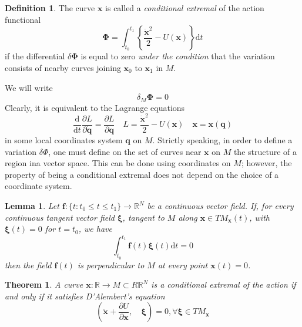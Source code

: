 \documentclass[conference]{IEEEtran}
\newtheorem{theorem}{Theorem}[section]
\newtheorem{lemma}{Lemma}[section]
\theoremstyle{definition}
\newtheorem{definition}{Definition}[section]
\theoremstyle{remark}
\begin{document}
    \begin{definition}
        The curve $\mathbf{x}$ is called a \emph{conditional extremal} of the action functional
        \begin{equation*}
            \bm{\Phi} = \int_{t_0}^{t_1} \left\{ \dfrac{\dot{\mathbf{x}}^2}{2} - U(\mathbf{x}) \right\} \mathrm{d} t
        \end{equation*}
        if the differential $\delta \bm{\Phi}$ is equal to zero \emph{under the condition} that the variation consists of nearby curves joining $\mathbf{x}_0$ to $\mathbf{x}_1$ in $M$.
    \end{definition}
    We will write
    \begin{equation*}
        \delta_M \bm{\Phi} = 0
    \end{equation*}
    Clearly, it is equivalent to the Lagrange equations
    \begin{equation*}
        \dfrac{\mathrm{d}}{\mathrm{d} t} \dfrac{\partial L}{\partial \dot{\mathbf{q}}} = \dfrac{\partial L}{\partial \mathbf{q}} \quad L = \dfrac{\dot{\mathbf{x}}^2}2 - U(\mathbf{x}) \quad \mathbf{x} = \mathbf{x}(\mathbf{q})
    \end{equation*}
    in some local coordinates system $\mathbf{q}$ on $M$. Strictly speaking, in order to define a variation $\delta \Phi$, one must define on the set of curves near $\mathbf{x}$ on $M$ the structure of a region ina vector space. This can be done using coordinates on $M$; however, the property of being a conditional extremal does not depend on the choice of a coordinate system.

    \begin{lemma}
        Let $\mathbf{f}: \{ t: t_0 \leq t \leq t_1 \} \to \mathbb{R}^N$ be a continuous vector field. If, for every continuous tangent vector field $\bm{\xi}$, tangent to $M$ along $\mathbf{x} \in TM_{\mathbf{x}}(t)$, with $\bm{\xi}(t) = 0$ for $t = t_0$, we have
        \begin{equation*}
            \int_{t_0}^{t_1} \mathbf{f}(t) \bm{\xi}(t) \mathrm{d} t = 0
        \end{equation*}
        then the field $\mathbf{f}(t)$ is perpendicular to $M$ at every point $\mathbf{x}(t) = 0$.
    \end{lemma}

    \begin{theorem}
        A curve $\mathbf{x} : \mathbb{R} \to M \subset R \mathbb{R}^N$ is a conditional extremal of the action if and only if it satisfies D'Alembert's equation
        \begin{equation*}
            \left( \ddot{\mathbf{x}} + \dfrac{\partial U}{\partial \mathbf{x}}, \quad \bm{\xi} \right) = 0, \forall \bm{\xi} \in TM_{\mathbf{x}}
        \end{equation*}
    \end{theorem}
\end{document}
